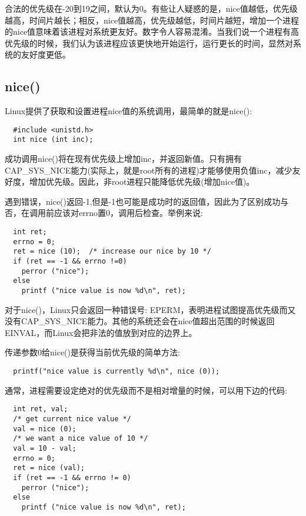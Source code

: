合法的优先级在-20到19之间，默认为0。有些让人疑惑的是，nice值越低，优先级越高，时间片越长；相反，nice值越高，优先级越低，时间片越短，增加一个进程的nice值意味着该进程对系统更友好。数字令人容易混淆。当我们说一个进程有高优先级的时候，我们认为该进程应该更快地开始运行，运行更长的时间，显然对系统的友好度更低。

\subsection{nice()}

Linux提供了获取和设置进程nice值的系统调用，最简单的就是nice():

\begin{lstlisting}
  #include <unistd.h>
  int nice (int inc);
\end{lstlisting}

成功调用nice()将在现有优先级上增加inc，并返回新值。只有拥有CAP\_SYS\_NICE能力(实际上，就是root所有的进程)才能够使用负值inc，减少友好度，增加优先级。因此，非root进程只能降低优先级(增加nice值)。

遇到错误，nice()返回-1,但是-1也可能是成功时的返回值，因此为了区别成功与否，在调用前应该对errno置0，调用后检查。举例来说:

\begin{lstlisting}
  int ret;
  errno = 0;
  ret = nice (10);  /* increase our nice by 10 */
  if (ret == -1 && errno !=0)
    perror ("nice");
  else
    printf ("nice value is now %d\n", ret);
\end{lstlisting}

对于nice()，Linux只会返回一种错误号: EPERM，表明进程试图提高优先级而又没有CAP\_SYS\_NICE能力。其他的系统还会在nice值超出范围的时候返回 EINVAL，而Linux会把非法的值放到对应的边界上。

传递参数0给nice()是获得当前优先级的简单方法:

\begin{lstlisting}
  printf("nice value is currently %d\n", nice (0));
\end{lstlisting}

通常，进程需要设定绝对的优先级而不是相对增量的时候，可以用下边的代码:

\begin{lstlisting}
  int ret, val;
  /* get current nice value */
  val = nice (0);
  /* we want a nice value of 10 */
  val = 10 - val;
  errno = 0;
  ret = nice (val);
  if (ret == -1 && errno != 0)
    perror ("nice");
  else
    printf ("nice value is now %d\n", ret);
\end{lstlisting}

